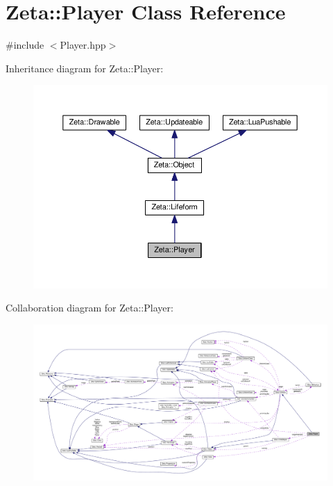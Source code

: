 \hypertarget{classZeta_1_1Player}{\section{Zeta\+:\+:Player Class Reference}
\label{classZeta_1_1Player}
}


{\ttfamily \#include $<$Player.\+hpp$>$}



Inheritance diagram for Zeta\+:\+:Player\+:\nopagebreak
\begin{figure}[H]
\begin{center}
\leavevmode
\includegraphics[width=350pt]{classZeta_1_1Player__inherit__graph}
\end{center}
\end{figure}


Collaboration diagram for Zeta\+:\+:Player\+:
\nopagebreak
\begin{figure}[H]
\begin{center}
\leavevmode
\includegraphics[width=350pt]{classZeta_1_1Player__coll__graph}
\end{center}
\end{figure}
